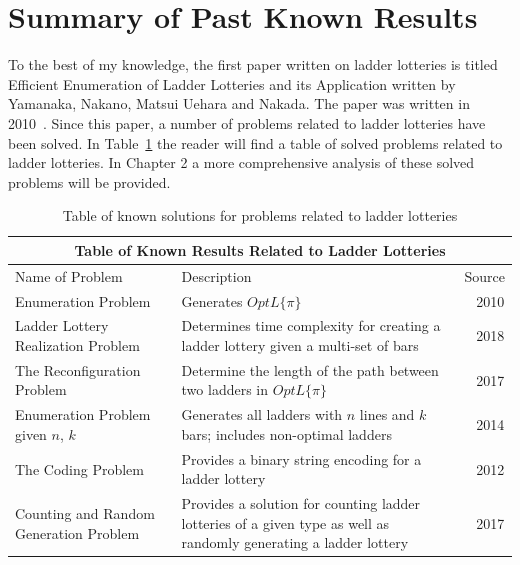 \section{Summary of Past Known Results}
To the best of my knowledge, the first paper written on ladder lotteries is titled Efficient Enumeration of 
Ladder Lotteries and its Application written by Yamanaka, Nakano, Matsui Uehara and Nakada. The paper 
was written in 2010~\cite{A1}. Since this paper, 
a number of problems related to ladder lotteries have been solved. In Table~\ref{Table:KnownProblems} 
the reader will find a table of solved problems related to ladder lotteries. In Chapter 2 a more comprehensive analysis of these 
solved problems will be provided.
\begin{table}[h]
	\centering
	\caption{Table of known solutions for problems related to ladder lotteries}
	\begin{tabular}{|p{4cm}||p{4cm}||p{4cm}|}
		\hline 
		\multicolumn{3}{|c|}{Table of Known Results Related to Ladder Lotteries}\\
		\hline 
		\hline 
		Name of Problem & Description & Source \\ 
		\hline 
		\small{Enumeration Problem} & \small{Generates $OptL\{\pi\}$} &~\cite{A1} 2010\\ 
		\hline
		\small{Ladder Lottery \newline Realization Problem} & \small{Determines time complexity for creating a ladder lottery given a multi-set of bars} &~\cite{A3} 2018\\ 
		\hline
		\small{The Reconfiguration \newline Problem} & \small{Determine the length of the path between two ladders in $OptL\{\pi\}$} &~\cite{A2} 2017\\ 
		\hline 
		\small{Enumeration Problem \newline given $n$, $k$} & \small{Generates all ladders with $n$ lines and $k$ bars; includes non-optimal ladders} &~\cite{A4} 2014\\ 
		\hline
		\small{The Coding Problem} & \small{Provides a binary string encoding for a ladder lottery} &~\cite{A5} 2012\\ 
		\hline 
		\small{Counting and \newline Random Generation \newline Problem} & \small{Provides a solution for counting ladder lotteries of a given type as well as randomly generating a ladder lottery} &~\cite{A6} 2017\\ 
		\hline
		
	\end{tabular}
	\label{Table:KnownProblems}
\end{table}

